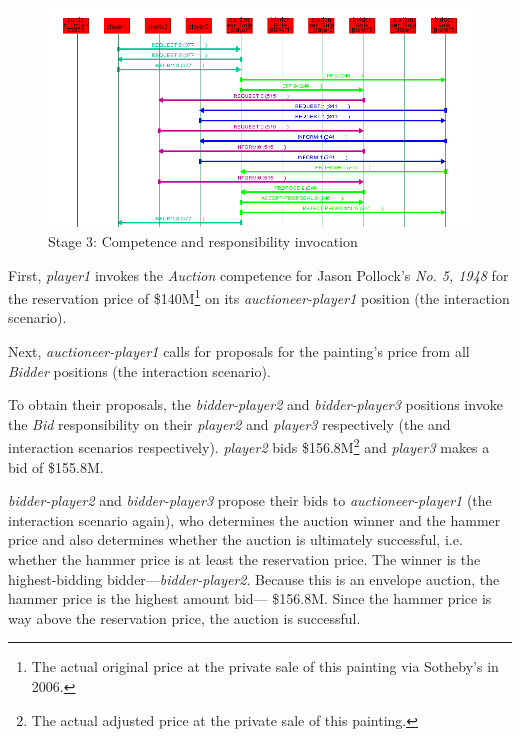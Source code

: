 \begin{figure}[H]
	\centering
	\includegraphics[width=\textwidth]{images/examples/example3-stage3a}
	\caption{Stage 3: Competence and responsibility invocation}
	\label{figure:example3-stage3a}
\end{figure}

First, \textit{player1} invokes the \textit{Auction} competence for Jason Pollock's \textit{No. 5, 1948} for the reservation price of \$140M\footnote{The actual original price at the private sale of this painting via Sotheby's in 2006.} on its \textit{auctioneer-player1} position (the {} interaction scenario).

Next, \textit{auctioneer-player1} calls for proposals for the painting's price from all \textit{Bidder} positions (the {} interaction scenario).

To obtain their proposals, the \textit{bidder-player2} and \textit{bidder-player3} positions invoke the \textit{Bid} responsibility on their \textit{player2} and \textit{player3} respectively (the {} and {} interaction scenarios respectively).
\textit{player2} bids \$156.8M\footnote{The actual adjusted price at the private sale of this painting.} and \textit{player3} makes a bid of \$155.8M.

\textit{bidder-player2} and \textit{bidder-player3} propose their bids to \textit{auctioneer-player1} (the {} interaction scenario again), who determines the auction winner and the hammer price and also determines whether the auction is ultimately successful, i.e. whether the hammer price is at least the reservation price.
The winner is the highest-bidding bidder---\textit{bidder-player2}.
Because this is an envelope auction, the hammer price is the highest amount bid--- \$156.8M.
Since the hammer price is way above the reservation price, the auction is successful.

